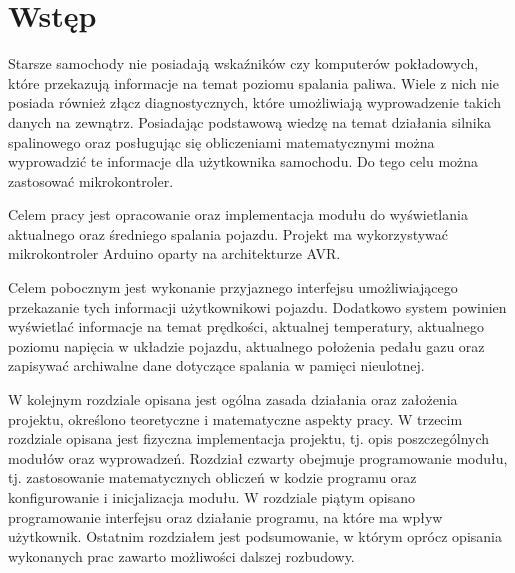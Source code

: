 \chapter{Wstęp}
\par     Starsze samochody nie posiadają wskaźników czy komputerów pokładowych, które przekazują informacje na temat poziomu spalania paliwa. Wiele z nich nie posiada również złącz diagnostycznych, które umożliwiają wyprowadzenie takich danych na zewnątrz. Posiadając podstawową wiedzę na temat działania silnika spalinowego oraz posługując się obliczeniami matematycznymi można wyprowadzić te informacje dla użytkownika samochodu. Do tego celu można zastosować mikrokontroler.
\par Celem pracy jest opracowanie oraz implementacja modułu do wyświetlania aktualnego oraz średniego spalania pojazdu. Projekt ma wykorzystywać mikrokontroler Arduino oparty na architekturze AVR.
\par Celem pobocznym jest wykonanie przyjaznego interfejsu umożliwiającego przekazanie tych informacji użytkownikowi pojazdu. Dodatkowo system powinien wyświetlać informacje na temat prędkości, aktualnej temperatury, aktualnego poziomu napięcia w układzie pojazdu, aktualnego położenia pedału gazu oraz zapisywać archiwalne dane dotyczące spalania w pamięci nieulotnej.
\par W kolejnym rozdziale opisana jest ogólna zasada działania oraz założenia projektu, określono teoretyczne i matematyczne aspekty pracy. W trzecim rozdziale opisana jest fizyczna implementacja projektu, tj. opis poszczególnych modułów oraz wyprowadzeń. Rozdział czwarty obejmuje programowanie modułu, tj. zastosowanie matematycznych obliczeń w kodzie programu oraz konfigurowanie i inicjalizacja modułu. W rozdziale piątym opisano programowanie interfejsu oraz działanie programu, na które ma wpływ użytkownik. Ostatnim rozdziałem jest podsumowanie, w którym oprócz opisania wykonanych prac zawarto możliwości dalszej rozbudowy.